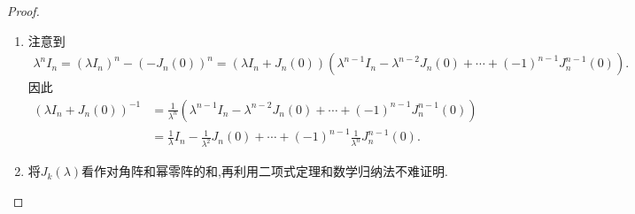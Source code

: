 \documentclass[../../main.tex]{subfiles}
\begin{document}
\begin{proof}
\begin{enumerate}[(1)]
\item 注意到
\begin{align*}
\lambda ^nI_n=\left( \lambda I_n \right) ^n-\left( -J_n\left( 0 \right) \right) ^n=\left( \lambda I_n+J_n\left( 0 \right) \right) \left( \lambda ^{n-1}I_n-\lambda ^{n-2}J_n\left( 0 \right) +\cdots +\left( -1 \right) ^{n-1}J_{n}^{n-1}\left( 0 \right) \right) .
\end{align*}
因此
\begin{align*}
\left( \lambda I_n+J_n\left( 0 \right) \right) ^{-1}&=\frac{1}{\lambda ^n}\left( \lambda ^{n-1}I_n-\lambda ^{n-2}J_n\left( 0 \right) +\cdots +\left( -1 \right) ^{n-1}J_{n}^{n-1}\left( 0 \right) \right) 
\\
&=\frac{1}{\lambda}I_n-\frac{1}{\lambda ^2}J_n\left( 0 \right) +\cdots +\left( -1 \right) ^{n-1}\frac{1}{\lambda ^n}J_{n}^{n-1}\left( 0 \right) .
\end{align*}

\item 将$J_k(\lambda)$看作对角阵和幂零阵的和,再利用二项式定理和数学归纳法不难证明.


\end{enumerate}
\end{proof}
\end{document}

